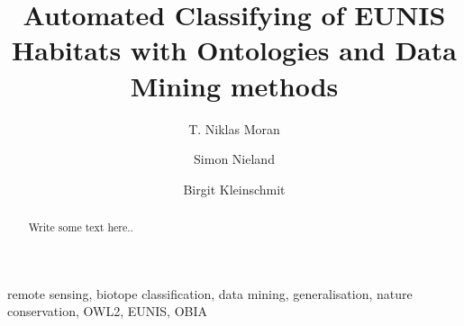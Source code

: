 \documentclass[authoryear, review,12pt,number]{elsarticle}
\begin{document}
\begin{frontmatter}
\linenumbers
\title{Automated Classifying of EUNIS Habitats with Ontologies and Data Mining
methods}


\author[TUB]{T. Niklas Moran}

\author[TUB]{Simon Nieland}
\author[TUB]{Birgit Kleinschmit}


\address[TUB]{Geoinformation in Environmental Planning Lab, Technische
Universit\"at Berlin, Stra\ss e des 17. Juni 145, 10623 Berlin, Germany}


\begin{abstract}
Write some text here..
\end{abstract}

\begin{keyword}
remote sensing, biotope classification, data mining,
generalisation, nature conservation, OWL2, EUNIS, OBIA
\end{keyword}

\end{frontmatter}

\linenumbers
\end{document}
